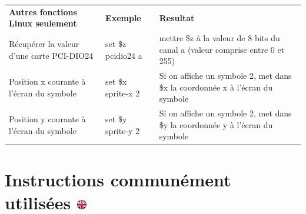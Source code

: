 \documentclass[
]{book}
\begin{document}
\begin{longtable}[]{@{}lll@{}}
\toprule
\endhead
\begin{minipage}[t]{0.29\columnwidth}\raggedright
\textbf{Autres fonctions Linux seulement}\strut
\end{minipage} & \begin{minipage}[t]{0.15\columnwidth}\raggedright
\textbf{Exemple}\strut
\end{minipage} & \begin{minipage}[t]{0.47\columnwidth}\raggedright
\textbf{Resultat}\strut
\end{minipage}\tabularnewline
\begin{minipage}[t]{0.29\columnwidth}\raggedright
Récupérer la valeur d'une carte PCI-DIO24\strut
\end{minipage} & \begin{minipage}[t]{0.15\columnwidth}\raggedright
set \$z pcidio24 a\strut
\end{minipage} & \begin{minipage}[t]{0.47\columnwidth}\raggedright
mettre \$z à la valeur de 8 bits du canal a (valeur comprise entre 0 et 255)\strut
\end{minipage}\tabularnewline
\begin{minipage}[t]{0.29\columnwidth}\raggedright
Position x courante à l'écran du symbole\strut
\end{minipage} & \begin{minipage}[t]{0.15\columnwidth}\raggedright
set \$x sprite-x 2\strut
\end{minipage} & \begin{minipage}[t]{0.47\columnwidth}\raggedright
Si on affiche un symbole 2, met dans \$x la coordonnée x à l'écran du symbole\strut
\end{minipage}\tabularnewline
\begin{minipage}[t]{0.29\columnwidth}\raggedright
Position y courante à l'écran du symbole\strut
\end{minipage} & \begin{minipage}[t]{0.15\columnwidth}\raggedright
set \$y sprite-y 2\strut
\end{minipage} & \begin{minipage}[t]{0.47\columnwidth}\raggedright
Si on affiche un symbole 2, met dans \$y la coordonnée y à l'écran du symbole\strut
\end{minipage}\tabularnewline
\bottomrule
\end{longtable}

\hypertarget{instructions-communuxe9ment-utilisuxe9es}{%
\section[Instructions communément utilisées ]{\texorpdfstring{Instructions communément utilisées \href{https://www.psytoolkit.org/doc3.4.0/syntax.html\#_commonly_used_instructions}{\protect\includegraphics{img/ukflag.png}}}{Instructions communément utilisées }}\label{instructions-communuxe9ment-utilisuxe9es}}
\end{document}
